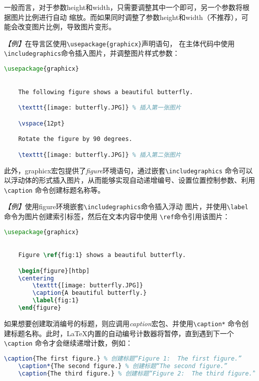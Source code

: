 一般而言，对于参数height和width，只需要调整其中一个即可，另一个参数将根据图片比例进行自动
缩放。而如果同时调整了参数height和width（不推荐），可能会改变图片比例，导致图片变形。

\emph{【例】}在导言区使用\texttt{\textbackslash{}usepackage\{graphicx\}}声明语句，
在主体代码中使用\texttt{\textbackslash{}includegraphics}命令插入图片，并调整图片样式参数：
\begin{lstlisting}[language=TeX]
    \usepackage{graphicx}
    

    The following figure shows a beautiful butterfly.

    \texttt{[image: butterfly.JPG]} % 插入第一张图片

    \vspace{12pt}

    Rotate the figure by 90 degrees.

    \texttt{[image: butterfly.JPG]} % 插入第二张图片
\end{lstlisting}

此外，graphicx宏包提供了\emph{figure}环境语句，通过嵌套\texttt{\textbackslash{}includegraphics}
命令可以以浮动体的形式插入图片，从而能够实现自动递增编号、设置位置控制参数、利用\texttt{\textbackslash{}caption}
命令创建标题名称等。

\emph{【例】}使用figure环境嵌套\texttt{\textbackslash{}includegraphics}命令插入浮动
图片，并使用\texttt{\textbackslash{}label}命令为图片创建索引标签，然后在文本内容中使用
\texttt{\textbackslash{}ref}命令引用该图片：
\begin{lstlisting}[language=TeX]
    \usepackage{graphicx}
    

    Figure \ref{fig:1} shows a beautiful butterfly.

    \begin{figure}[htbp]
    \centering
        \texttt{[image: butterfly.JPG]}
        \caption{A beautiful butterfly.}
        \label{fig:1}
    \end{figure}
\end{lstlisting}

如果想要创建取消编号的标题，则应调用\emph{caption}宏包、并使用\texttt{\textbackslash{}caption*}
命令创建标题名称。此时，LaTeX内置的自动编号计数器将暂停，直到遇到下一个\texttt{\textbackslash{}caption}
命令才会继续递增计数，例如：
\begin{lstlisting}[language=TeX]
    \caption{The first figure.} % 创建标题“Figure 1:  The first figure.”
    \caption*{The second figure.} % 创建标题“The second figure.”
    \caption{The third figure.} % 创建标题“Figure 2:  The third figure.”
\end{lstlisting}